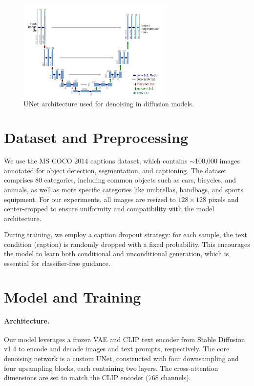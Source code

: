 \documentclass[11pt,a4paper]{article}
\begin{document}
\begin{figure}[ht]
\centering
\includegraphics[width=0.69\textwidth]{figures/unet.png}
\caption{UNet architecture used for denoising in diffusion models.}
\end{figure}


\section{Dataset and Preprocessing}

We use the MS COCO 2014 captions dataset, which contains $\sim$100,000 images annotated for object detection, segmentation, and captioning. The dataset comprises 80 categories, including common objects such as cars, bicycles, and animals, as well as more specific categories like umbrellas, handbags, and sports equipment. For our experiments, all images are resized to $128\times128$ pixels and center-cropped to ensure uniformity and compatibility with the model architecture.

During training, we employ a caption dropout strategy: for each sample, the text condition (caption) is randomly dropped with a fixed probability. This encourages the model to learn both conditional and unconditional generation, which is essential for classifier-free guidance.


\section{Model and Training}

\paragraph{Architecture.} Our model leverages a frozen VAE and CLIP text encoder from Stable Diffusion v1.4\cite{rombach2022stablediffusion} to encode and decode images and text prompts, respectively. The core denoising network is a custom UNet, constructed with four downsampling and four upsampling blocks, each containing two layers. The cross-attention dimensions are set to match the CLIP encoder (768 channels).
\end{document}
